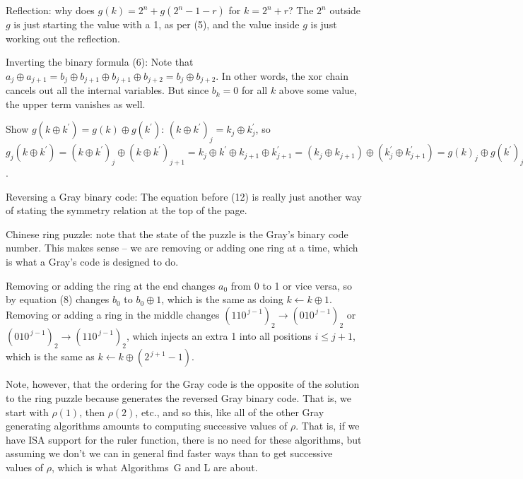 \noindent [p 284] Reflection: why does $g\left(k\right) = 2^n + g\left(
2^n - 1 - r\right)$ for $k = 2^n + r$?  The $2^n$ outside $g$ is
just starting the value with a 1, as per (5), and the value inside
$g$ is just working out the reflection.

\vskip 0.08in \noindent [p 284] Inverting the binary formula (6): Note that
$a_j \oplus a_{j + 1} = b_j \oplus b_{j+1} \oplus b_{j+1} \oplus b_{j+2}
= b_j \oplus b_{j+2}$.  In other words, the xor chain cancels
out all the internal variables.  But since $b_k = 0$ for all
$k$ above some value, the upper term vanishes as well.

\vskip 0.08in \noindent [p 284] Show $g\left(k \oplus k^{\prime}\right) = 
g\left(k\right) \oplus g\left(k^{\prime}\right)$:
$\left(k \oplus k^{\prime}\right)_j = k_j \oplus k^{\prime}_j$,
so $g_j\left(k \oplus k^{\prime}\right) = \left(k \oplus k^{\prime}\right)_j
\oplus \left(k \oplus k^{\prime}\right)_{j+1} =
k_j \oplus k^{\prime} \oplus k_{j+1} \oplus k^{\prime}_{j+1} =
\left(k_j \oplus k_{j+1}\right) \oplus \left(k^{\prime}_j \oplus k^{\prime}_{j+1}
\right) = g\left(k\right)_j \oplus g\left(k^{\prime}\right)_j$.

\vskip 0.08in \noindent [p 284] Reversing a Gray binary code: The equation
before (12) is really just another way of stating the symmetry
relation at the top of the page.

\vskip 0.08in \noindent [p 285] Chinese ring puzzle: note that the state
of the puzzle is the Gray's binary code number.  This makes sense --
we are removing or adding one ring at a time, which is what
a Gray's code is designed to do.

Removing or adding the ring at the end changes $a_0$ from
0 to 1 or vice versa, so by equation (8) changes $b_0$ to $b_0 \oplus 1$,
which is the same as doing $k \gets k \oplus 1$.  Removing or
adding a ring in the middle changes $\left(110^{\,j-1}\right)_2 \rightarrow
\left(010^{\,j-1}\right)_2$ or $\left(010^{\,j-1}\right)_2 \rightarrow
\left(110^{\,j-1}\right)_2$, which injects an extra 1 into all positions
$i \le j+1$, which is the same as $k \gets k \oplus \left(2^{\,j+1} - 1\right)$.

Note, however, that the ordering for the Gray code 
is the opposite of the solution to the ring puzzle
because generates the reversed Gray binary code.  That is,
we start with $\rho\left(1\right)$, then $\rho\left(2\right)$, etc.,
and so this, like all of the other Gray generating algorithms
amounts to computing successive values of $\rho$.  That is,
if we have ISA support for the ruler function, there is no need
for these algorithms, but assuming we don't we can in general
find faster ways than to get successive values of $\rho$, which
is what Algorithms~G and L are about.


